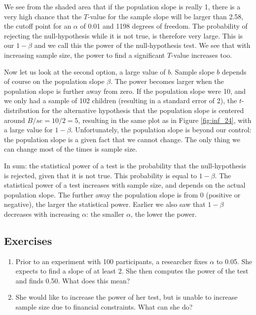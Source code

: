 \documentclass[]{book}\usepackage[]{graphicx}\usepackage[]{color}
\begin{document}
We see from the shaded area that if the population slope is really 1, there is a very high chance that the $T$-value for the sample slope will be larger than 2.58, the cutoff point for an $\alpha$ of 0.01 and 1198 degrees of freedom. The probability of rejecting the null-hypothesis while it is not true, is therefore very large. This is our $1-\beta$ and we call this the power of the null-hypothesis test. We see that with increasing sample size, the power to find a significant $T$-value increases too.

Now let us look at the second option, a large value of $b$. Sample slope $b$ depends of course on the population slope $\beta$. The power becomes larger when the population slope is further away from zero. If the population slope were 10, and we only had a sample of 102 children (resulting in a standard error of 2), the $t$-distribution for the alternative hypothesis that the population slope is centered around $B/se=10/2=5$, resulting in the same plot as in Figure \ref{fig:inf_24}, with a large value for $1-\beta$. Unfortunately, the population slope is beyond our control: the population slope is a given fact that we cannot change. The only thing we can change most of the times is sample size. 

In sum: the statistical power of a test is the probability that the null-hypothesis is rejected, given that it is not true. This probability is equal to $1-\beta$. The statistical power of a test increases with sample size, and depends on the actual population slope. The further away the population slope is from 0 (positive or negative), the larger the statistical power. Earlier we also saw that $1-\beta$ decreases with increasing $\alpha$: the smaller $\alpha$, the lower the power.


\subsection{Exercises}


\begin{enumerate}

\item Prior to an experiment with 100 participants, a researcher fixes $\alpha$ to 0.05. She expects to find a slope of at least 2. She then computes the power of the test and finds 0.50. What does this mean?

\item She would like to increase the power of her test, but is unable to increase sample size due to financial constraints. What can she do?


\end{enumerate}
\end{document}
